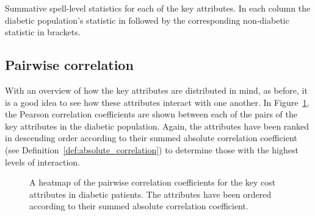 \begin{table}[htbp]
    \vspace{-40pt}
    \resizebox{\imgwidth}{!}{%
        
    }

    \vspace{3pt}

    \resizebox{\imgwidth}{!}{%
        
    }

    \vspace{3pt}
    
    \resizebox{\imgwidth}{!}{%
        
    }

    \vspace{3pt}

    \resizebox{\imgwidth}{!}{%
        
    }

    \vspace{3pt}

    \resizebox{\imgwidth}{!}{%
        
    }

    \vspace{3pt}

    \resizebox{\imgwidth}{!}{%
        
    }

    \thispagestyle{empty}
    \caption{Summative spell-level statistics for each of the key attributes. In
        each column the diabetic population's statistic in followed by the
        corresponding non-diabetic statistic in brackets.}%
    \label{tab:diabetes_summative}
\end{table}

\subsection{Pairwise correlation}\label{subsec:diabetes_correlation}

With an overview of how the key attributes are distributed in mind, as before,
it is a good idea to see how these attributes interact with one another. In
Figure~\ref{fig:diabetes_corr_heatmap}, the Pearson correlation coefficients
are shown between each of the pairs of the key attributes in the diabetic
population. Again, the attributes have been ranked in descending order according
to their summed absolute correlation coefficient (see
Definition~\ref{def:absolute_correlation}) to determine those with the highest
levels of interaction.

\begin{figure}[htbp]
    \caption{A heatmap of the pairwise correlation coefficients for the key cost
        attributes in diabetic patients. The attributes have been ordered
        according to their summed absolute correlation coefficient.}%
    \label{fig:diabetes_corr_heatmap}
\end{figure}

